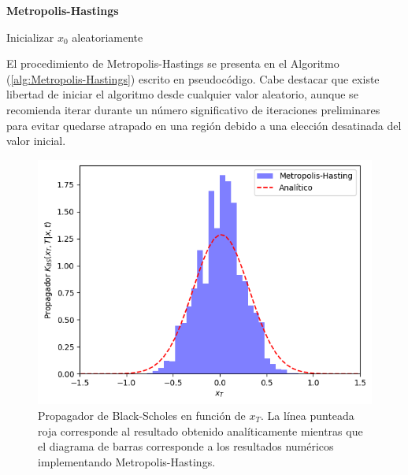 \documentclass[11pt,a4paper]{article}
\begin{document}
\begin{algorithm}[H]
\DontPrintSemicolon
\label{alg:Metropolis-Hastings}
\caption{\bf Metropolis-Hastings}


\nl Inicializar $x_0$ aleatoriamente\;
\nl {}
\end{algorithm}
\noindent El procedimiento de Metropolis-Hastings se presenta en el Algoritmo (\ref{alg:Metropolis-Hastings}) escrito en pseudoc\'odigo. Cabe destacar que existe libertad de iniciar el algoritmo desde cualquier valor aleatorio, aunque se recomienda iterar durante un n\'umero significativo de iteraciones preliminares para evitar quedarse atrapado en una regi\'on debido a una elecci\'on desatinada del valor inicial.\\
\begin{figure}[H]
\centering
\includegraphics[width=01.0\textwidth]{MetropolisHastings.png}
\caption{Propagador de Black-Scholes en función de $x_T$. La l\'inea punteada roja corresponde al resultado obtenido anal\'iticamente mientras que el diagrama de barras corresponde a los resultados numéricos implementando Metropolis-Hastings.}
\label{fig:MetropolisHastings}
\end{figure}
\end{document}
